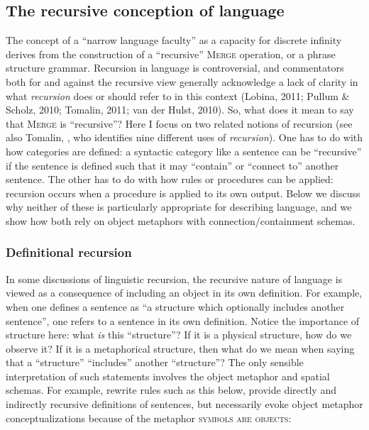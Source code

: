 \subsection{The recursive conception of language}

The concept of a “narrow language faculty” as a capacity for discrete infinity derives from the construction of a “recursive” \textsc{Merge} operation, or a phrase structure grammar. Recursion in language is controversial, and commentators both for and against the recursive view generally acknowledge a lack of clarity in what \textit{recursion} does or should refer to in this context (Lobina, 2011; Pullum \& Scholz, 2010; Tomalin, 2011; van der Hulst, 2010). So, what does it mean to say that \textsc{Merge} is “recursive”? Here I focus on two related notions of recursion (see also Tomalin, , who identifies nine different uses of \textit{recursion}). One has to do with how categories are defined: a syntactic category like a sentence can be “recursive” if the sentence is defined such that it may “contain” or “connect to” another sentence. The other has to do with how rules or procedures can be applied: recursion occurs when a procedure is applied to its own output. Below we discuss why neither of these is particularly appropriate for describing language, and we show how both rely on object metaphors with connection/containment schemas.

\subsubsection{Definitional recursion}

In some discussions of linguistic recursion, the recursive nature of language is viewed as a consequence of including an object in its own definition. For example, when one defines a sentence as “a structure which optionally includes another sentence”, one refers to a sentence in its own definition. Notice the importance of structure here: what \textit{is} this “structure”? If it is a physical structure, how do we observe it? If it is a metaphorical structure, then what do we mean when saying that a “structure” “includes” another “structure”? The only sensible interpretation of such statements involves the object metaphor and spatial schemas. For example, rewrite rules such as this below, provide directly and indirectly recursive definitions of sentences, but necessarily evoke object metaphor conceptualizations because of the metaphor \textsc{symbols} \textsc{are} \textsc{objects}:

